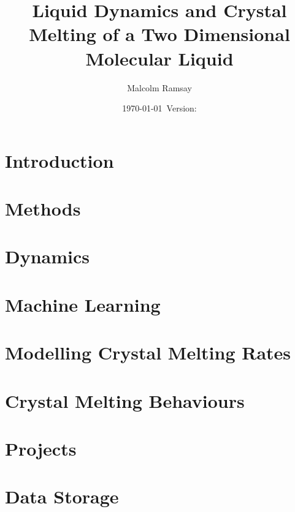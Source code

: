 \documentclass[12pt, a4paper]{report}
\title{Liquid Dynamics and Crystal Melting of a Two Dimensional Molecular Liquid}
\author{Malcolm Ramsay}
\date{\today{}~Version: \version}
\begin{document}
\beforepreface{}
\afterpreface{}

\chapter{Introduction} \label{sec:Introduction}






\chapter{Methods} \label{sec:Methods}







\chapter{Dynamics} \label{sec:Dynamics}




\chapter{Machine Learning} \label{sec:Machine_Learning}




\chapter{Modelling Crystal Melting Rates} \label{sec:Crystal_Melting}




\chapter{Crystal Melting Behaviours}




\printbibliography{}

\begin{appendices}
  \chapter{Projects}
  

  \chapter{Data Storage}
  

\end{appendices}
\end{document}
